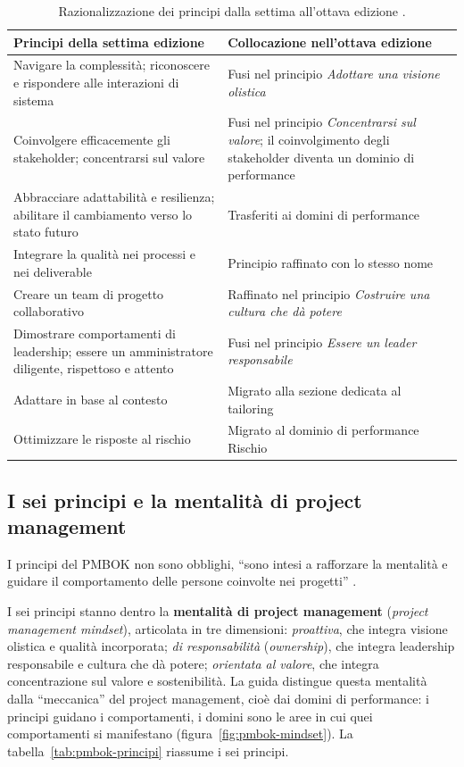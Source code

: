 \begin{table}[htbp]
\centering
\small
\caption{Razionalizzazione dei principi dalla settima all'ottava edizione \cite{pmbok8}.}
\label{tab:pmbok-principi-evoluzione}
\begin{tabularx}{\textwidth}{@{}XX@{}}
\toprule
\textbf{Principi della settima edizione} & \textbf{Collocazione nell'ottava edizione} \\
\midrule
Navigare la complessit\`a; riconoscere e rispondere alle interazioni di sistema & Fusi nel principio \emph{Adottare una visione olistica} \\
Coinvolgere efficacemente gli stakeholder; concentrarsi sul valore & Fusi nel principio \emph{Concentrarsi sul valore}; il coinvolgimento degli stakeholder diventa un dominio di performance \\
Abbracciare adattabilit\`a e resilienza; abilitare il cambiamento verso lo stato futuro & Trasferiti ai domini di performance \\
Integrare la qualit\`a nei processi e nei deliverable & Principio raffinato con lo stesso nome \\
Creare un team di progetto collaborativo & Raffinato nel principio \emph{Costruire una cultura che d\`a potere} \\
Dimostrare comportamenti di leadership; essere un amministratore diligente, rispettoso e attento & Fusi nel principio \emph{Essere un leader responsabile} \\
Adattare in base al contesto & Migrato alla sezione dedicata al tailoring \\
Ottimizzare le risposte al rischio & Migrato al dominio di performance Rischio \\
\bottomrule
\end{tabularx}
\end{table}
\newpage


\subsection{I sei principi e la mentalit\`a di project management}

I principi del PMBOK non sono obblighi, ``sono intesi a rafforzare la
mentalit\`a e guidare il comportamento delle persone coinvolte nei progetti''
\cite{pmbok8}.

I sei principi stanno dentro la \textbf{mentalit\`a di project management}
(\emph{project management mindset}), articolata in tre dimensioni:
\emph{proattiva}, che integra visione olistica e qualit\`a incorporata; \emph{di
responsabilit\`a} (\emph{ownership}), che integra leadership responsabile e
cultura che d\`a potere; \emph{orientata al valore}, che integra concentrazione
sul valore e sostenibilit\`a. La guida distingue questa mentalit\`a dalla
``meccanica'' del project management, cio\`e dai domini di performance: i
principi guidano i comportamenti, i domini sono le aree in cui quei
comportamenti si manifestano (figura~\ref{fig:pmbok-mindset}). La
tabella~\ref{tab:pmbok-principi} riassume i sei principi.

